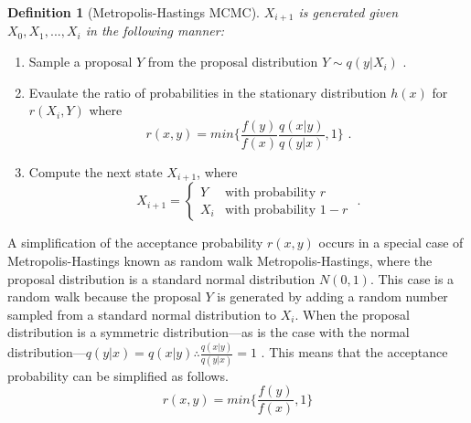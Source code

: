\documentclass[
  12pt,
]{book}
\theoremstyle{definition}
\newtheorem{definition}{Definition}[chapter]
\theoremstyle{definition}
\theoremstyle{definition}
\theoremstyle{remark}
\begin{document}
\begin{definition}[Metropolis-Hastings MCMC]
\protect\hypertarget{def:methas}{}{\label{def:methas} {} }\emph{\(X_{i+1}\) is generated given \(X_{0},X_{1},...,X_{i}\) in the following manner:}

\begin{enumerate}
  \item Sample a proposal $Y$ from the proposal distribution $Y \sim q(y|X_{i}) \textrm{ .}$
  \item Evaulate the ratio of probabilities in the stationary distribution $h(x)$ for $r(X_{i},Y)$ where $$ r(x,y)=min \{\frac{f(y)}{f(x)} \frac{q(x|y)}{q(y|x)} ,1 \} \textrm{ .}$$
  \item Compute the next state $X_{i+1}$, where $$X_{i+1}=\begin{cases}Y & \textrm{with probability }r \\ X_{i} & \textrm{with probability }1-r \end{cases} \textrm{ .}$$
\end{enumerate}
\end{definition}

A simplification of the acceptance probability \(r(x,y)\) occurs in a special case of Metropolis-Hastings known as random walk Metropolis-Hastings, where the proposal distribution is a standard normal distribution \(N(0,1)\).
This case is a random walk because the proposal \(Y\) is generated by adding a random number sampled from a standard normal distribution to \(X_{i}\).
When the proposal distribution is a symmetric distribution---as is the case with the normal distribution---\(q(y|x)=q(x|y) \therefore \frac{q(x|y)}{q(y|x)}=1\) .
This means that the acceptance probability can be simplified as follows. \[r(x,y)=min \{\frac{f(y)}{f(x)},1 \}\]
\end{document}
